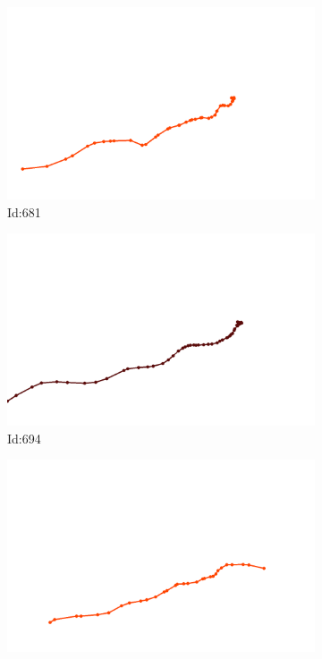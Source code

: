 \documentclass[12pt,twoside]{report}
\begin{document}
\begin{figure}
\begin{subfigure}[b]{0.20\textwidth}
\centering
\includegraphics[width=\textwidth]{../trajectories/681.png}
\caption{Id:681}
\end{subfigure}
\begin{subfigure}[b]{0.20\textwidth}
\centering
\includegraphics[width=\textwidth]{../trajectories/694.png}
\caption{Id:694}
\end{subfigure}
\begin{subfigure}[b]{0.20\textwidth}
\centering
\includegraphics[width=\textwidth]{../trajectories/730.png}

\end{subfigure}
\end{figure}
\end{document}
